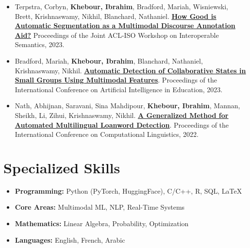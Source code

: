 \documentclass[letterpaper,11pt]{article}
\newcommand{\pubtitle}[2]{\href{#1}{\textbf{\ul{#2}}}}
\begin{document}
\begin{itemize}
\item Terpstra, Corbyn, \textbf{Khebour, Ibrahim}, Bradford, Mariah, Wisniewski, Brett, Krishnaswamy, Nikhil, Blanchard, Nathaniel. 
\pubtitle{https://aclanthology.org/2023.isa-1.10.pdf}{How Good is Automatic Segmentation as a Multimodal Discourse Annotation Aid?} 
Proceedings of the Joint ACL-ISO Workshop on Interoperable Semantics, 2023.

\item Bradford, Mariah, \textbf{Khebour, Ibrahim}, Blanchard, Nathaniel, Krishnaswamy, Nikhil. 
\pubtitle{https://bbykitty.github.io/assets/Automatic\%20Detection\%20of\%20Collaborative\%20States.pdf}{Automatic Detection of Collaborative States in Small Groups Using Multimodal Features}. 
Proceedings of the International Conference on Artificial Intelligence in Education, 2023.

\item Nath, Abhijnan, Saravani, Sina Mahdipour, \textbf{Khebour, Ibrahim}, Mannan, Sheikh, Li, Zihui, Krishnaswamy, Nikhil. 
\pubtitle{https://aclanthology.org/2022.coling-1.442.pdf}{A Generalized Method for Automated Multilingual Loanword Detection}. 
Proceedings of the International Conference on Computational Linguistics, 2022.

\end{itemize}

\vspace{-0.2in}

\section{Specialized Skills}
\begin{itemize}[leftmargin=0.15in]

\item \textbf{Programming:} Python (PyTorch, HuggingFace), C/C++, R, SQL, LaTeX

\item \textbf{Core Areas:} Multimodal ML, NLP, Real-Time Systems

\item \textbf{Mathematics:} Linear Algebra, Probability, Optimization

\item \textbf{Languages:} English, French, Arabic

\end{itemize}
\end{document}
